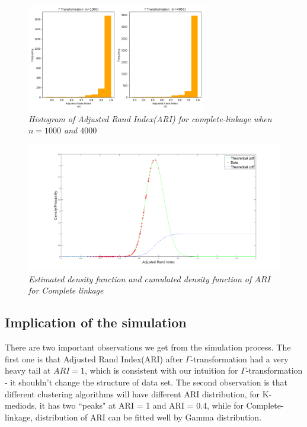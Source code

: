 \documentclass{uonmathreport}
\begin{document}
\begin{figure}[H]
 \begin{center}
   \includegraphics[width=0.7\textwidth]{simulate2_1.png}
 \end{center}
 \caption{\textit{Histogram of Adjusted Rand Index(ARI) for complete-linkage when $n=1000$ and $4000$ }}
 \label{fig:single-linkage}
\end{figure}

\begin{figure}[H]
 \begin{center}
   \includegraphics[width=1\textwidth]{Complete-linkage-cdf.png}
 \end{center}
 \caption{\textit{Estimated density function and cumulated density function of $ARI$ for Complete linkage}}
 \label{fig:single-linkage2}
\end{figure}

\subsection{Implication of the simulation} \label{subsec: simulationSum}
There are two important observations we get from the simulation process. The first one is that Adjusted Rand Index(ARI) after $\Gamma$-transformation had a very heavy tail at $ARI=1$, which is consistent with our intuition for $\Gamma$-transformation - it shouldn't change the structure of data set. The second observation is that different clustering algorithms will have different ARI distribution, for K-mediods, it has two 	``peaks" at ARI = 1 and ARI = 0.4, while for Complete-linkage, distribution of ARI can be fitted well by Gamma distribution. 
\end{document}
